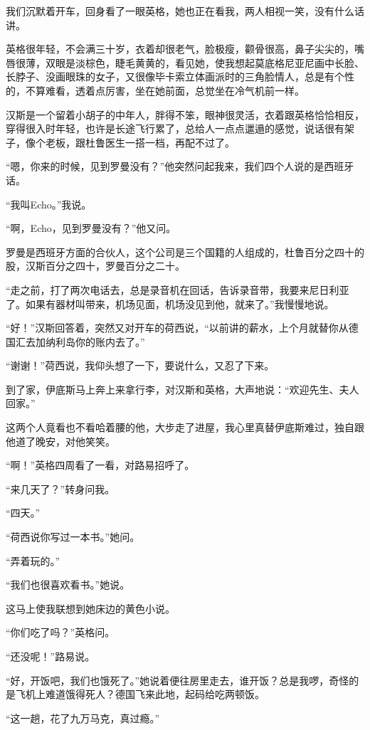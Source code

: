 \par 我们沉默着开车，回身看了一眼英格，她也正在看我，两人相视一笑，没有什么话讲。
\par 英格很年轻，不会满三十岁，衣着却很老气，脸极瘦，颧骨很高，鼻子尖尖的，嘴唇很薄，双眼是淡棕色，睫毛黄黄的，看见她，使我想起莫底格尼亚尼画中长脸、长脖子、没画眼珠的女子，又很像毕卡索立体画派时的三角脸情人，总是有个性的，不算难看，透着点厉害，坐在她前面，总觉坐在冷气机前一样。
\par 汉斯是一个留着小胡子的中年人，胖得不笨，眼神很灵活，衣着跟英格恰恰相反，穿得很入时年轻，也许是长途飞行累了，总给人一点点邋遢的感觉，说话很有架子，像个老板，跟杜鲁医生一搭一档，再配不过了。
\par “嗯，你来的时候，见到罗曼没有？”他突然问起我来，我们四个人说的是西班牙话。
\par “我叫Echo。”我说。
\par “啊，Echo，见到罗曼没有？”他又问。
\par 罗曼是西班牙方面的合伙人，这个公司是三个国籍的人组成的，杜鲁百分之四十的股，汉斯百分之四十，罗曼百分之二十。
\par “走之前，打了两次电话去，总是录音机在回话，告诉录音带，我要来尼日利亚了。如果有器材叫带来，机场见面，机场没见到他，就来了。”我慢慢地说。
\par “好！”汉斯回答着，突然又对开车的荷西说，“以前讲的薪水，上个月就替你从德国汇去加纳利岛你的账内去了。”
\par “谢谢！”荷西说，我仰头想了一下，要说什么，又忍了下来。
\par 到了家，伊底斯马上奔上来拿行李，对汉斯和英格，大声地说：“欢迎先生、夫人回家。”
\par 这两个人竟看也不看哈着腰的他，大步走了进屋，我心里真替伊底斯难过，独自跟他道了晚安，对他笑笑。
\par “啊！”英格四周看了一看，对路易招呼了。
\par “来几天了？”转身问我。
\par “四天。”
\par “荷西说你写过一本书。”她问。
\par “弄着玩的。”
\par “我们也很喜欢看书。”她说。
\par 这马上使我联想到她床边的黄色小说。
\par “你们吃了吗？”英格问。
\par “还没呢！”路易说。
\par “好，开饭吧，我们也饿死了。”她说着便往房里走去，谁开饭？总是我啰，奇怪的是飞机上难道饿得死人？德国飞来此地，起码给吃两顿饭。
\par “这一趟，花了九万马克，真过瘾。”
